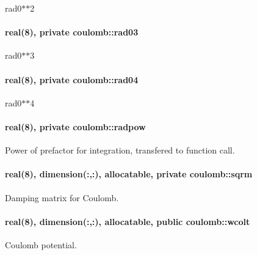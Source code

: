 rad0$\ast$$\ast$2 

\paragraph[{\texorpdfstring{rad03}{rad03}}]{\setlength{\rightskip}{0pt plus 5cm}real(8), private coulomb\+::rad03\hspace{0.3cm}{\ttfamily [private]}}\hypertarget{namespacecoulomb_a9de74ed78e9600b349fa66222b9c19fb}{}\label{namespacecoulomb_a9de74ed78e9600b349fa66222b9c19fb}


rad0$\ast$$\ast$3 

\paragraph[{\texorpdfstring{rad04}{rad04}}]{\setlength{\rightskip}{0pt plus 5cm}real(8), private coulomb\+::rad04\hspace{0.3cm}{\ttfamily [private]}}\hypertarget{namespacecoulomb_a313ec73163c8cb8f31d822c4d0efb479}{}\label{namespacecoulomb_a313ec73163c8cb8f31d822c4d0efb479}


rad0$\ast$$\ast$4 

\paragraph[{\texorpdfstring{radpow}{radpow}}]{\setlength{\rightskip}{0pt plus 5cm}real(8), private coulomb\+::radpow\hspace{0.3cm}{\ttfamily [private]}}\hypertarget{namespacecoulomb_a8f7cac5e6ca7d551c55d4d3a4ba5ecbe}{}\label{namespacecoulomb_a8f7cac5e6ca7d551c55d4d3a4ba5ecbe}


Power of prefactor for integration, transfered to function call. 

\paragraph[{\texorpdfstring{sqrm}{sqrm}}]{\setlength{\rightskip}{0pt plus 5cm}real(8), dimension(\+:,\+:), allocatable, private coulomb\+::sqrm\hspace{0.3cm}{\ttfamily [private]}}\hypertarget{namespacecoulomb_ae1cdbea5b00603d6ba85ce2d3e0bf612}{}\label{namespacecoulomb_ae1cdbea5b00603d6ba85ce2d3e0bf612}


Damping matrix for Coulomb. 

\paragraph[{\texorpdfstring{wcolt}{wcolt}}]{\setlength{\rightskip}{0pt plus 5cm}real(8), dimension(\+:,\+:), allocatable, public coulomb\+::wcolt}\hypertarget{namespacecoulomb_a7fb786776bc5f65a639b10f9966ee2ee}{}\label{namespacecoulomb_a7fb786776bc5f65a639b10f9966ee2ee}


Coulomb potential. 

